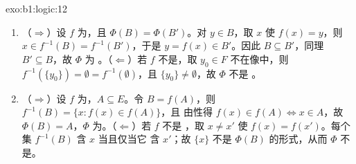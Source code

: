 \begin{solution}{exo:b1:logic:12}
\begin{enumerate}
  \item （$\Rightarrow$）设 $f$ 为，且 $\Phi(B) =
        \Phi(B')$。对 $y \in B$，取 $x$ 使 $f(x) = y$，则 $x
        \in f^{-1}(B) = f^{-1}(B')$，于是 $y = f(x) \in B'$。因此 $B
        \subseteq B'$，同理 $B' \subseteq B$，故 $\Phi$ 为
        。（$\Leftarrow$）若 $f$ 不是，取 $y_0
        \in F$ 不在像中，则 $f^{-1}(\{y_0\}) = \emptyset =
        f^{-1}(\emptyset)$，且 $\{y_0\} \neq \emptyset$，故 $\Phi$ 不是
        。
  \item （$\Rightarrow$）设 $f$ 为，$A \subseteq E$。令
        $B = f(A)$，则 $f^{-1}(B) = \{x : f(x) \in f(A)\}$，且
        由性得 $f(x) \in f(A) \iff x \in A$，故 $\Phi(B) =
        A$，$\Phi$ 为。（$\Leftarrow$）若 $f$ 不是
        ，取 $x \neq x'$ 使 $f(x) = f(x')$。每个
        集 $f^{-1}(B)$ 含 $x$ 当且仅当它
        含 $x'$；故 $\{x\}$ 不是 $\Phi(B)$ 的形式，从而
        $\Phi$ 不是。
\end{enumerate}
\end{solution}

